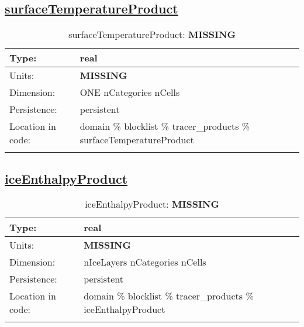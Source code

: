 \subsection[surfaceTemperatureProduct]{\hyperref[sec:var_tab_tracer_products]{surfaceTemperatureProduct}}
\label{subsec:var_sec_tracer_products_surfaceTemperatureProduct}
\begin{center}
\begin{longtable}{| p{2.0in} | p{4.0in} |}
        \hline 
        Type: & real \\
        \hline 
        Units: & {\bf \color{red} MISSING} \\
        \hline 
        Dimension: & ONE nCategories nCells \\
        \hline 
        Persistence: & persistent \\
        \hline 
         Location in code: & domain \% blocklist \% tracer\_products \% surfaceTemperatureProduct \\
         \hline 
    \caption{surfaceTemperatureProduct: {\bf \color{red} MISSING}}
\end{longtable}
\end{center}
\subsection[iceEnthalpyProduct]{\hyperref[sec:var_tab_tracer_products]{iceEnthalpyProduct}}
\label{subsec:var_sec_tracer_products_iceEnthalpyProduct}
\begin{center}
\begin{longtable}{| p{2.0in} | p{4.0in} |}
        \hline 
        Type: & real \\
        \hline 
        Units: & {\bf \color{red} MISSING} \\
        \hline 
        Dimension: & nIceLayers nCategories nCells \\
        \hline 
        Persistence: & persistent \\
        \hline 
         Location in code: & domain \% blocklist \% tracer\_products \% iceEnthalpyProduct \\
         \hline 
    \caption{iceEnthalpyProduct: {\bf \color{red} MISSING}}
\end{longtable}
\end{center}
